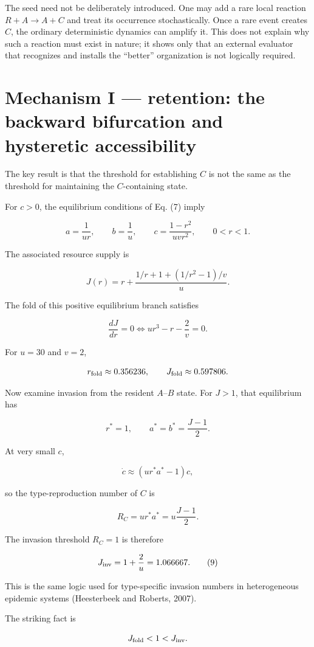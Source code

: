 \documentclass[11pt]{article}
\begin{document}
The seed need not be deliberately introduced. One may add a rare local
reaction \(R+A \to A+C\) and treat its occurrence stochastically. Once a
rare event creates \(C\), the ordinary deterministic dynamics can
amplify it. This does not explain why such a reaction must exist in
nature; it shows only that an external evaluator that recognizes and
installs the ``better'' organization is not logically required.

\section{Mechanism I --- retention: the backward bifurcation and
hysteretic
accessibility}
The key result is that the threshold for establishing \(C\) is not the
same as the threshold for maintaining the \(C\)-containing state.

For \(c>0\), the equilibrium conditions of Eq. (7) imply

\[
a = \frac{1}{ur}, \qquad b = \frac{1}{u}, \qquad c = \frac{1-r^2}{uvr^2}, \qquad 0<r<1.
\]

The associated resource supply is

\[
J(r) = r + \frac{1/r + 1 + (1/r^2-1)/v}{u}. \tag{8}
\]

The fold of this positive equilibrium branch satisfies

\[
\frac{dJ}{dr}=0 \iff ur^3 - r - \frac{2}{v} = 0.
\]

For \(u=30\) and \(v=2\),

\[
r_{\rm fold} \approx 0.356236, \qquad J_{\rm fold} \approx 0.597806.
\]

Now examine invasion from the resident \(A\)--\(B\) state. For \(J>1\),
that equilibrium has

\[
r^*=1, \qquad a^*=b^*=\frac{J-1}{2}.
\]

At very small \(c\),

\[
\dot c \approx (ur^*a^*-1)c,
\]

so the type-reproduction number of \(C\) is

\[
R_C = ur^*a^* = u\frac{J-1}{2}.
\]

The invasion threshold \(R_C=1\) is therefore

\[
J_{\rm inv} = 1+\frac{2}{u} = 1.066667. \tag{9}
\]

This is the same logic used for type-specific invasion numbers in
heterogeneous epidemic systems (Heesterbeek and Roberts, 2007).

The striking fact is

\[
J_{\rm fold} < 1 < J_{\rm inv}.
\]
\end{document}
